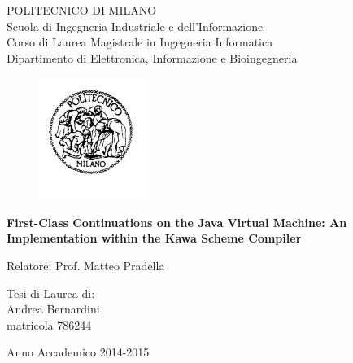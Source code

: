 \documentclass[12pt,a4paper,oneside,openright]{book}
\date{}
\begin{document}
\thispagestyle{empty} \vspace*{-1.5cm} {\bfseries
\begin{center}
  \Large
  POLITECNICO DI MILANO\\
  \large
  Scuola di Ingegneria Industriale e dell’Informazione\\
  \normalsize
  Corso di Laurea Magistrale in Ingegneria Informatica\\
  Dipartimento di Elettronica, Informazione e Bioingegneria\\

  \vspace*{0.7cm}
  \begin{figure}[htbp]
    \begin{center}
      \includegraphics[width=3.5cm]{./figures/logopm}
    \end{center}
  \end{figure}
  \vspace*{0.3cm} \LARGE



  \textbf{First-Class Continuations on the Java Virtual Machine: An Implementation within the Kawa Scheme Compiler}\\



  \vspace*{.75truecm}

\end{center}
\vspace*{3.0cm} \large
\begin{flushleft}


  Relatore: Prof. Matteo Pradella \\


\end{flushleft}
\vspace*{1.0cm}
\begin{flushright}


  Tesi di Laurea di:\\ Andrea Bernardini \\ matricola 786244 \\


\end{flushright}
\vspace*{0.5cm}
\begin{center}



  Anno Accademico 2014-2015
\end{center} \clearpage
}
\end{document}
